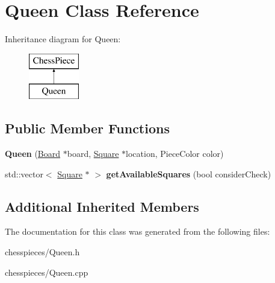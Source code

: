 \hypertarget{class_queen}{}\section{Queen Class Reference}
\label{class_queen}
Inheritance diagram for Queen\+:\begin{figure}[H]
\begin{center}
\leavevmode
\includegraphics[height=2.000000cm]{class_queen}
\end{center}
\end{figure}
\subsection*{Public Member Functions}
\begin{DoxyCompactItemize}
\item 
\mbox{\label{class_queen_acdfa2fb3cb38ecf2e178d7ef7db6bee7}} 
{\bfseries Queen} (\mbox{\hyperlink{class_board}{Board}} $\ast$board, \mbox{\hyperlink{class_square}{Square}} $\ast$location, Piece\+Color color)
\item 
\mbox{\label{class_queen_aea5f53c17a06bb6524dc92b80f82d456}} 
std\+::vector$<$ \mbox{\hyperlink{class_square}{Square}} $\ast$ $>$ {\bfseries get\+Available\+Squares} (bool consider\+Check)
\end{DoxyCompactItemize}
\subsection*{Additional Inherited Members}


The documentation for this class was generated from the following files\+:\begin{DoxyCompactItemize}
\item 
chesspieces/Queen.\+h\item 
chesspieces/Queen.\+cpp\end{DoxyCompactItemize}
